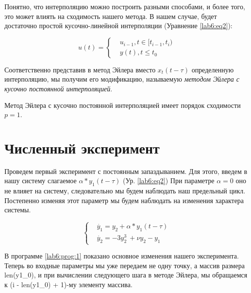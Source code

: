Понятно, что интерполяцию можно построить разными способами,
и более того, это может влиять на сходимость нашего метода.
В нашем случае, будет достаточно простой кусочно-линейной
интерполяции (Уравнение \ref{lab6:eq2}):

\begin{equation}\label{lab6:eq2}
    u(t) = \begin{cases}
        &u_{i-1}, t \in [t_{i-1}, t_i) \\
        &y(t), t \leq t_0
    \end{cases}
\end{equation}

Соответственно представив в метод Эйлера вместо $x_t(t - \tau)$
определенную интерполяцию, мы получим его модификацию, называемую
\textit{методом Эйлера с кусочно постоянной интерполяцией}.

\begin{theorem}
    Метод Эйлера с кусочно постоянной интерполяцией имеет порядок
    сходимости $p = 1$.
\end{theorem}



\section{Численный эксперимент}

Проведем первый эксперимент с постоянным запаздыванием.
Для этого, введем в нашу систему слагаемое $\alpha * y_1(t-\tau)$ (Ур. \ref{lab6:eq2})
При параметре $\alpha = 0$ оно не влияет на систему, следовательно мы будем
наблюдать наш предельный цикл. Постепенно изменяя этот параметр мы будем наблюдать
на изменения характера системы.

\begin{equation}\label{lab6:eq3}
\begin{cases}
    &\dot{y_1} = y_2 + \alpha * y_1(t-\tau)\\
    &\dot{y_2} = -3y_2^3\ + \nu y_2 - y_1
\end{cases}
\end{equation}

В программе \ref{lab6:prog:1} показано основное изменения нашего
эксперимента. Теперь во входные параметры мы уже передаем не
одну точку, а массив размера len(y1\_0), и при вычислении следующего
шага в методе Эйлера, мы обращаемся к (i - len(y1\_0) + 1)-му элементу массива.

